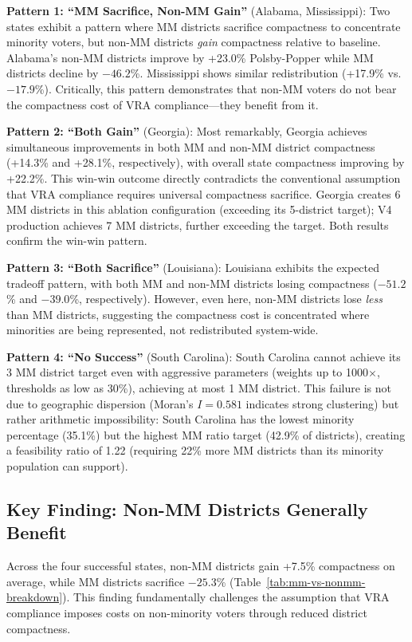 \textbf{Pattern 1: ``MM Sacrifice, Non-MM Gain''} (Alabama, Mississippi): Two states exhibit a pattern where MM districts sacrifice compactness to concentrate minority voters, but non-MM districts \emph{gain} compactness relative to baseline. Alabama's non-MM districts improve by +23.0\% Polsby-Popper while MM districts decline by $-46.2$\%. Mississippi shows similar redistribution (+17.9\% vs. $-17.9$\%). Critically, this pattern demonstrates that non-MM voters do not bear the compactness cost of VRA compliance---they benefit from it.

\textbf{Pattern 2: ``Both Gain''} (Georgia): Most remarkably, Georgia achieves simultaneous improvements in both MM and non-MM district compactness (+14.3\% and +28.1\%, respectively), with overall state compactness improving by +22.2\%. This win-win outcome directly contradicts the conventional assumption that VRA compliance requires universal compactness sacrifice. Georgia creates 6 MM districts in this ablation configuration (exceeding its 5-district target); V4 production achieves 7 MM districts, further exceeding the target. Both results confirm the win-win pattern.

\textbf{Pattern 3: ``Both Sacrifice''} (Louisiana): Louisiana exhibits the expected tradeoff pattern, with both MM and non-MM districts losing compactness ($-51.2$\% and $-39.0$\%, respectively). However, even here, non-MM districts lose \emph{less} than MM districts, suggesting the compactness cost is concentrated where minorities are being represented, not redistributed system-wide.

\textbf{Pattern 4: ``No Success''} (South Carolina): South Carolina cannot achieve its 3 MM district target even with aggressive parameters (weights up to 1000$\times$, thresholds as low as 30\%), achieving at most 1 MM district. This failure is not due to geographic dispersion (Moran's $I = 0.581$ indicates strong clustering) but rather arithmetic impossibility: South Carolina has the lowest minority percentage (35.1\%) but the highest MM ratio target (42.9\% of districts), creating a feasibility ratio of 1.22 (requiring 22\% more MM districts than its minority population can support).

\subsection{Key Finding: Non-MM Districts Generally Benefit}

Across the four successful states, non-MM districts gain +7.5\% compactness on average, while MM districts sacrifice $-25.3$\% (Table~\ref{tab:mm-vs-nonmm-breakdown}). This finding fundamentally challenges the assumption that VRA compliance imposes costs on non-minority voters through reduced district compactness.

